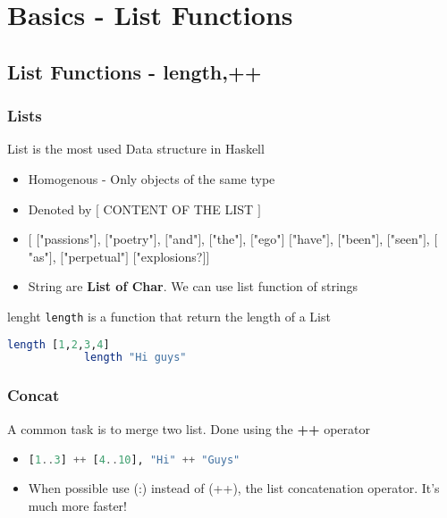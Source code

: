\section{Basics - List Functions}
\frame{\sectionpage}

\subsection{List Functions - length,++ }
	\begin{frame}[fragile]\frametitle{Lists}
		List is the most used Data structure in Haskell
		\begin{itemize}
		\item Homogenous - Only objects of the same type
		\item Denoted by $[$ CONTENT OF THE LIST $]$
		\item $[$ $[$"passions"$]$, $[$"poetry"$]$, $[$"and"$]$, $[$"the"$]$,
		$[$"ego"$]$ $[$"have"$]$, $[$"been"$]$, $[$"seen"$]$, $[$"as"$]$, $[$"perpetual"$]$
		$[$"explosions?$]$$]$
		\item String are \textbf{List of Char}. We can use list function of
		strings
		\end{itemize}
		\begin{exampleblock}{lenght}
		\texttt{length} is a function that return the length of a List
		 \begin{lstlisting}[language=Haskell,basicstyle=\footnotesize\ttfamily]
			length [1,2,3,4]
			length "Hi guys" 
		\end{lstlisting}
		\end{exampleblock}
	\end{frame}

	
	\begin{frame}[fragile]\frametitle{Concat}
		A common task is to merge two list. Done using the \textbf{++} operator
		\begin{itemize}
		  \item 
		  \begin{lstlisting}[language=Haskell,basicstyle=\footnotesize\ttfamily]
			[1..3] ++ [4..10], "Hi" ++ "Guys"
		\end{lstlisting}
		\item When possible use (:) instead of (++), the list concatenation operator.
		It's much more faster!
		\end{itemize}
		
	\end{frame}